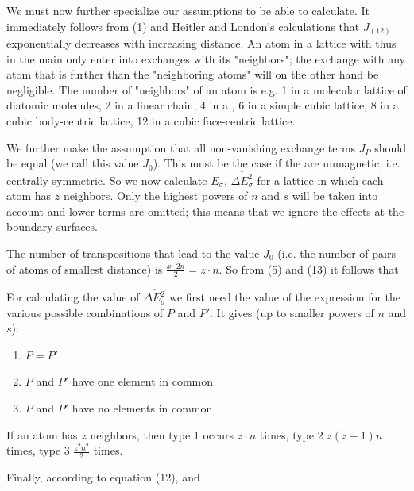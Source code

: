\begin{paper}{1}
We must now further specialize our assumptions to be able to calculate.  It immediately follows from (1) and Heitler and London's calculations that $J_{(12)}$ exponentially decreases with increasing distance. An atom in a lattice with thus in the main only enter into exchanges with its "neighbors"; the exchange with any atom that is further than the "neighboring atoms" will on the other hand be negligible. The number of "neighbors" of an atom is e.g. 1 in a molecular lattice of diatomic molecules, 2 in a linear chain, 4 in a , 6 in a simple cubic lattice, 8 in a cubic body-centric lattice, 12 in a cubic face-centric lattice.

We further make the assumption that all non-vanishing exchange terms $J_P$ should be equal (we call this value $J_0$). This must be the case if the  are unmagnetic, i.e. centrally-symmetric. So we now calculate $E_\sigma$, $\overline{\Delta E_\sigma^2}$ for a lattice in which each atom has $z$ neighbors. Only the highest powers of $n$ and $s$ will be taken into account and lower terms are omitted; this means that we ignore the effects at the boundary surfaces.

The number of transpositions that lead to the value $J_0$ (i.e. the number of pairs of atoms of smallest distance) is $\frac{x\cdot 2n}{2} = z\cdot n$. So from (5) and (13) it follows that

For calculating the value of $\overline{\Delta E_\sigma^2}$ we first need the value of the expression
for the various possible combinations of $P$ and $P'$. It gives (up to smaller powers of $n$ and $s$):
\begin{enumerate}
	\item $P=P'$
	\item $P$ and $P'$ have one element in common
	\item $P$ and $P'$ have no elements in common
\end{enumerate}

If an atom has $z$ neighbors, then type 1 occurs $z\cdot n$ times, type 2 $z(z-1)n$ times, type 3 $\frac{z^2 n^2}{2}$ times.

Finally, according to equation (12),
and


\end{paper}
